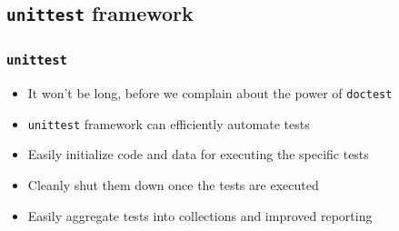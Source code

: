 \documentclass[12pt,presentation]{beamer}
\begin{document}
\subsection{\texttt{unittest} framework}
\begin{frame}[fragile]
  \frametitle{\texttt{unittest}}
  \begin{itemize}
  \item It won't be long, before we complain about the power of
    \texttt{doctest} 
  \item \texttt{unittest} framework can efficiently automate tests
  \item Easily initialize code and data for executing the specific
    tests
  \item Cleanly shut them down once the tests are executed
  \item Easily aggregate tests into collections and improved reporting
  \end{itemize}
\end{frame}
\end{document}
